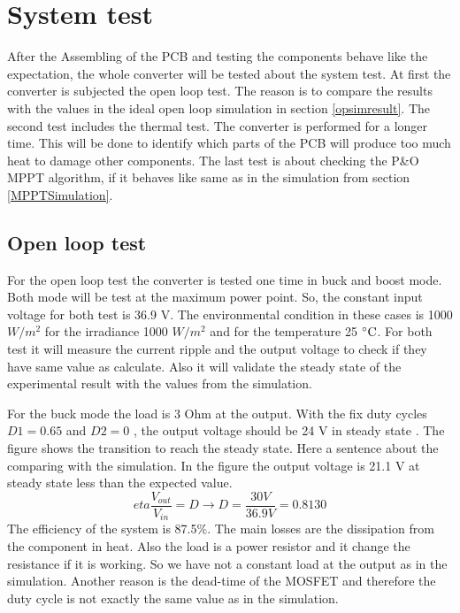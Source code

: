 \section{System test}
After the Assembling of the PCB and testing the components behave like the expectation, the whole converter will be tested about the system test. At first the converter is subjected the open loop test. The reason is to compare the results with the values in the ideal open loop simulation in section \ref{opsimresult}. The second test includes the thermal test. The converter is performed for a longer time. This will be done to identify which parts of the PCB will produce too much heat to damage other components. The last test is about checking the P\&O MPPT algorithm, if it behaves like same as in the simulation from section \ref{MPPTSimulation}.

\subsection{Open loop test}
For the open loop test the converter is tested one time in buck and boost mode. Both mode will be test at the maximum power point. So, the constant input voltage for both test is 36.9 V. The environmental condition in these cases is 1000 $W /m^2$ for the irradiance 1000 $W /m^2$ and for the temperature 25 $\decC$. For both test it will measure the current ripple and the output voltage to check if they have same value as calculate. Also it will validate the steady state of the experimental result with the values from the simulation.

For the buck mode the load is 3 Ohm at the output. With the fix duty cycles $D1 = 0.65$ and  $D2 = 0$ , the output voltage should be 24 V in steady state . The figure shows the transition to reach the steady state. Here a sentence about the comparing with the simulation.  In the figure the output voltage is 21.1 V  at steady state less than the expected value.
\begin{equation}\label{effiencybuckmode}
eta\frac{V_{out}}{V_{in}} = D  \rightarrow D = \frac{30V}{36.9V}= 0.8130 
\end{equation}
The efficiency of the system is 87.5$\%$. The main losses are the dissipation from the component in heat. Also the load is a power resistor and it change the resistance if it is working. So we have not a constant load at the output as in the simulation. Another reason is the dead-time of the MOSFET and therefore the duty cycle is not exactly the same value as in the simulation. 

